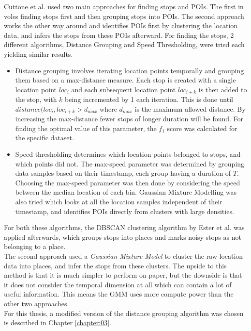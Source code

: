 Cuttone et al. used two main approaches for finding stops and POIs. The first in voles finding stops first and then grouping stops into POIs. The second approach works the other way around and identifies POIs first by clustering the location data, and infers the stops from these POIs afterward. For finding the stops, 2 different algorithms, Distance Grouping and Speed Thresholding, were tried each yielding similar results.

\begin{itemize}
    \item Distance grouping involves iterating location points temporally and grouping them based on a max-distance measure. Each stop is created with a single location point $loc_{i}$ and each subsequent location point $loc_{i+k}$ is then added to the stop, with $k$ being incremented by 1 each iteration. This is done until $distance(loc_{i}, loc_{i+k} > d_{max}$ where $d_{max}$ is the maximum allowed distance. By increasing the max-distance fewer stops of longer duration will be found. For finding the optimal value of this parameter, the $f_1$ score was calculated for the specific dataset.  

    \item Speed thresholding determines which location points belonged to stops, and which points did not. The max-speed parameter was determined by grouping data samples based on their timestamp, each group having a duration of $T$. Choosing the max-speed parameter was then done by considering the speed between the median location of each bin. Gaussian Mixture Modelling was also tried which looks at all the location samples independent of their timestamp, and identifies POIs directly from clusters with large densities. 
\end{itemize}

For both these algorithms, the DBSCAN clustering algorithm by Ester et al. \cite{density-based-1996} was applied afterwards, which groups stops into places and marks noisy stops as not belonging to a place.\\

The second approach used a \textit{Gaussian Mixture Model} to cluster the raw location data into places, and infer the stops from these clusters. The upside to this method is that it is much simpler to perform on paper, but the downside is that it does not consider the temporal dimension at all which can contain a lot of useful information. This means the GMM uses more compute power than the other two approaches. \\

For this thesis, a modified version of the distance grouping algorithm was chosen is described in Chapter \ref{chapter:03}.